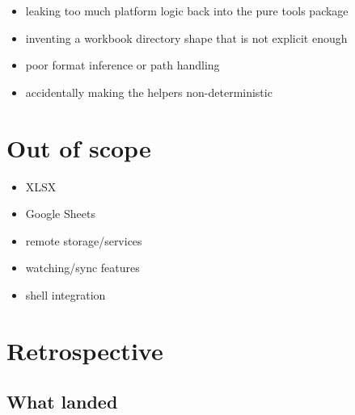 \begin{itemize}
\tightlist
\item
  leaking too much platform logic back into the pure tools package
\item
  inventing a workbook directory shape that is not explicit enough
\item
  poor format inference or path handling
\item
  accidentally making the helpers non-deterministic
\end{itemize}

\section{Out of scope}\label{record-192-out-of-scope}

\begin{itemize}
\tightlist
\item
  XLSX
\item
  Google Sheets
\item
  remote storage/services
\item
  watching/sync features
\item
  shell integration
\end{itemize}

\section{Retrospective}\label{record-192-retrospective}

\subsection{What landed}\label{record-192-what-landed}

